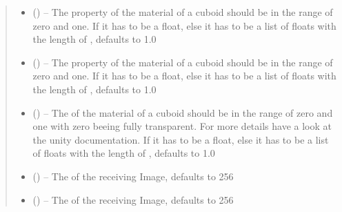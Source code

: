 \documentclass[letterpaper,10pt,english]{sphinxmanual}
\begin{document}
\begin{fulllineitems}
\begin{fulllineitems}
\begin{quote}
\begin{description}
\begin{itemize}
\item {} 
 (\sphinxstyleliteralemphasis{\sphinxupquote{, }}) -- The  property of the material of a cuboid should be in the range of zero and one.
If  it has to be a float, else it has to be a list of floats with the length of , defaults to 1.0

\item {} 
 (\sphinxstyleliteralemphasis{\sphinxupquote{, }}) -- The  property of the material of a cuboid should be in the range of zero and one.
If  it has to be a float, else it has to be a list of floats with the length of , defaults to 1.0

\item {} 
 (\sphinxstyleliteralemphasis{\sphinxupquote{, }}) -- The  of the material of a cuboid should be in the range of zero and one with zero beeing fully transparent. For more details have a look at the unity documentation.
If  it has to be a float, else it has to be a list of floats with the length of , defaults to 1.0

\item {} 
 (\sphinxstyleliteralemphasis{\sphinxupquote{, }}) -- The  of the receiving Image, defaults to 256

\item {} 
 (\sphinxstyleliteralemphasis{\sphinxupquote{, }}) -- The  of the receiving Image, defaults to 256


\end{itemize}
\end{description}
\end{quote}
\end{fulllineitems}
\end{fulllineitems}
\end{document}
